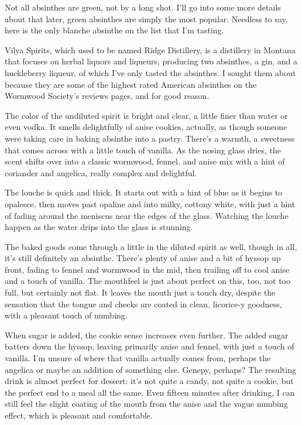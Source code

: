 \documentclass[12pt,letterpaper,oneside]{memoir}
\begin{document}
  Not all absinthes are green, not by a long shot.  I'll go into some more details about that later, green absinthes are simply the most popular.  Needless to say, here is the only blanche absinthe on the list that I'm tasting.

  Vilya Spirits, which used to be named Ridge Distillery, is a distillery in Montana that focuses on herbal liquors and liqueurs, producing two absinthes, a gin, and a huckleberry liqueur, of which I've only tasted the absinthes.  I sought them about because they are some of the highest rated American absinthes on the Wormwood Society's reviews pages, and for good reason.

  The color of the undiluted spirit is bright and clear, a little finer than water or even vodka.  It smells delightfully of anise cookies, actually, as though someone were taking care in baking absinthe into a pastry.  There's a warmth, a sweetness that comes across with a little touch of vanilla.  As the nosing glass dries, the scent shifts over into a classic wormwood, fennel, and anise mix with a hint of coriander and angelica, really complex and delightful.

  The louche is quick and thick.  It starts out with a hint of blue as it begins to opalesce, then moves past opaline and into milky, cottony white, with just a hint of fading around the meniscus near the edges of the glass.  Watching the louche happen as the water drips into the glass is stunning.

  The baked goods come through a little in the diluted spirit as well, though in all, it's still definitely an absinthe.  There's plenty of anise and a bit of hyssop up front, fading to fennel and wormwood in the mid, then trailing off to cool anise and a touch of vanilla.  The mouthfeel is just about perfect on this, too, not too full, but certainly not flat.  It leaves the mouth just a touch dry, despite the sensation that the tongue and cheeks are coated in clean, licorice-y goodness, with a pleasant touch of numbing.

  When sugar is added, the cookie sense increases even further.  The added sugar batters down the hyssop, leaving primarily anise and fennel, with just a touch of vanilla.  I'm unsure of where that vanilla actually comes from, perhaps the angelica or maybe an addition of something else. Genepy, perhaps?  The resulting drink is almost perfect for dessert: it's not quite a candy, not quite a cookie, but the perfect end to a meal all the same.  Even fifteen minutes after drinking, I can still feel the slight coating of the mouth from the anise and the vague numbing effect, which is pleasant and comfortable.
\end{document}

